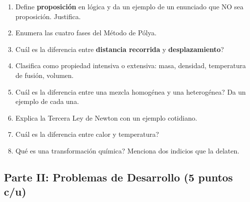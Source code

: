 \documentclass[12pt, letterpaper]{article}
\begin{document}
\begin{enumerate}[leftmargin=*]
  \item Define \textbf{proposición} en lógica y da un ejemplo de un enunciado que NO sea proposición. Justifica.

  \item Enumera las cuatro fases del Método de Pólya.

  \item \textquestiondown Cuál es la diferencia entre \textbf{distancia recorrida} y \textbf{desplazamiento}?

  \item Clasifica como propiedad intensiva o extensiva: masa, densidad, temperatura de fusión, volumen.

  \item \textquestiondown Cuál es la diferencia entre una mezcla homogénea y una heterogénea? Da un ejemplo de cada una.

  \item Explica la Tercera Ley de Newton con un ejemplo cotidiano.

  \item \textquestiondown Cuál es la diferencia entre calor y temperatura?

  \item \textquestiondown Qué es una transformación química? Menciona dos indicios que la delaten.
\end{enumerate}

\subsection{Parte II: Problemas de Desarrollo (5 puntos c/u)}
\end{document}
